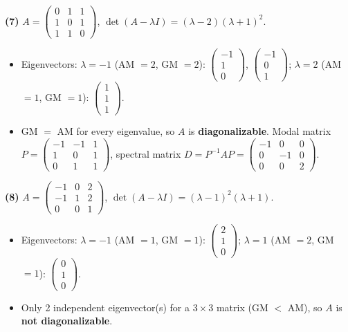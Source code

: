 \noindent\textbf{(7)} $A=\begin{pmatrix}0 & 1 & 1 \\ 1 & 0 & 1 \\ 1 & 1 & 0\end{pmatrix}$, $\det(A-\lambda I)=\left(\lambda - 2\right) \left(\lambda + 1\right)^{2}$.
\begin{itemize}\item Eigenvectors: $\lambda=-1$ (AM $=2$, GM $=2$): $\begin{pmatrix}-1 \\ 1 \\ 0\end{pmatrix}$, $\begin{pmatrix}-1 \\ 0 \\ 1\end{pmatrix}$; $\lambda=2$ (AM $=1$, GM $=1$): $\begin{pmatrix}1 \\ 1 \\ 1\end{pmatrix}$.
\item GM $=$ AM for every eigenvalue, so $A$ is \textbf{diagonalizable}. Modal matrix $P=\begin{pmatrix}-1 & -1 & 1 \\ 1 & 0 & 1 \\ 0 & 1 & 1\end{pmatrix}$, spectral matrix $D=P^{-1}AP=\begin{pmatrix}-1 & 0 & 0 \\ 0 & -1 & 0 \\ 0 & 0 & 2\end{pmatrix}$.\end{itemize}

\noindent\textbf{(8)} $A=\begin{pmatrix}-1 & 0 & 2 \\ -1 & 1 & 2 \\ 0 & 0 & 1\end{pmatrix}$, $\det(A-\lambda I)=\left(\lambda - 1\right)^{2} \left(\lambda + 1\right)$.
\begin{itemize}\item Eigenvectors: $\lambda=-1$ (AM $=1$, GM $=1$): $\begin{pmatrix}2 \\ 1 \\ 0\end{pmatrix}$; $\lambda=1$ (AM $=2$, GM $=1$): $\begin{pmatrix}0 \\ 1 \\ 0\end{pmatrix}$.
\item Only 2 independent eigenvector(s) for a $3\times3$ matrix (GM $<$ AM), so $A$ is \textbf{not diagonalizable}.\end{itemize}
